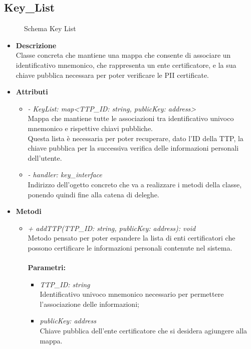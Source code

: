 \subsection{Key\_List}
\begin{figure}[!h]
	\centering
	\caption{Schema Key List}
\end{figure}
\begin{itemize}
	\item \textbf{Descrizione}\\
	Classe concreta che mantiene una mappa che consente di associare un identificativo mnemonico, che rappresenta un ente certificatore, e la sua chiave pubblica necessara per poter verificare le \gls{PII} certificate.
	\item \textbf{Attributi}
	\begin{itemize}
		\item \textit{- KeyList: map<TTP\_ID: string, publicKey: address>}\\
		Mappa che mantiene tutte le associazioni tra identificativo univoco mnemonico e rispettive chiavi pubbliche.\\
		Questa lista è necessaria per poter recuperare, dato l'ID della \gls{TTP}, la chiave pubblica per la successiva verifica delle informazioni personali dell'utente.
		\item \textit{- handler: key\_interface}\\
		Indirizzo dell'ogetto concreto che va a realizzare i metodi della classe, ponendo quindi fine alla catena di deleghe.		
	\end{itemize}
	\item \textbf{Metodi}
	\begin{itemize}
		\item \textit{+ addTTP(TTP\_ID: string, publicKey: address): void}\\
		Metodo pensato per poter espandere la lista di enti certificatori che possono certificare le informazioni personali contenute nel sistema.\\\\
		\textbf{Parametri:}
		\begin{itemize}
			\item \textit{TTP\_ID: string}\\
			Identificativo univoco mnemonico necessario per permettere l'associazione delle informazioni;
			\item \textit{publicKey: address}\\
			Chiave pubblica dell'ente certificatore che si desidera agiungere alla mappa.

\end{itemize}
\end{itemize}
\end{itemize}
